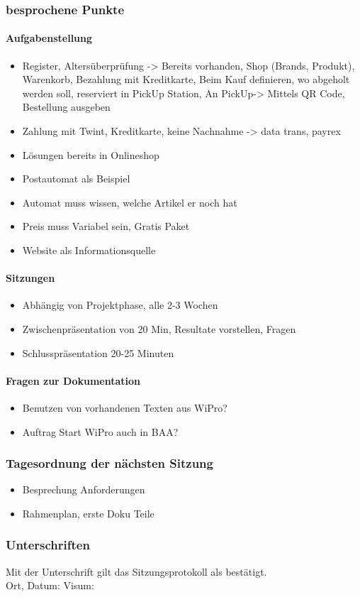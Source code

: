 \subsubsection{besprochene Punkte}
\paragraph{Aufgabenstellung}
	\begin{itemize}
		\item Register, Altersüberprüfung -> Bereits vorhanden, Shop (Brands, Produkt), Warenkorb, Bezahlung mit Kreditkarte, Beim Kauf definieren, wo abgeholt werden soll, reserviert in PickUp Station, An PickUp-> Mittels QR Code, Bestellung ausgeben
		\item Zahlung mit Twint, Kreditkarte, keine Nachnahme -> data trans, payrex
		\item Lösungen bereits in Onlineshop 
		\item Postautomat als Beispiel
		\item Automat muss wissen, welche Artikel er noch hat
		\item Preis muss Variabel sein, Gratis Paket
		\item Website als Informationsquelle
	 	\end{itemize}
\paragraph{Sitzungen}
	\begin{itemize}
		\item Abhängig von Projektphase, alle 2-3 Wochen
		\item Zwischenpräsentation von 20 Min, Resultate vorstellen, Fragen
		\item Schlusspräsentation 20-25 Minuten
	\end{itemize}
	
\paragraph{Fragen zur Dokumentation}
\begin{itemize}
	\item Benutzen von vorhandenen Texten aus WiPro?
	\item Auftrag Start WiPro auch in BAA?
\end{itemize}
\subsubsection{Tagesordnung der nächsten Sitzung}
\begin{itemize}
	\item Besprechung Anforderungen 
	\item Rahmenplan, erste Doku Teile
\end{itemize}


\subsubsection{Unterschriften}

Mit der Unterschrift gilt das Sitzungsprotokoll als bestätigt.\\

Ort, Datum:	\underline{\hspace*{6cm}}	\hspace*{1cm} Visum:	\underline{\hspace*{4cm}}
\newpage



